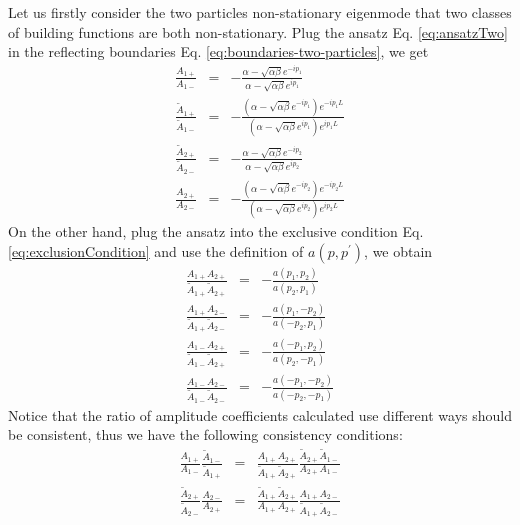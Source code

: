 \documentclass[aps,showpacs,twocolumn,floatfix,prx,superscriptaddress]{revtex4-1}
\begin{document}
Let us firstly consider the two particles non-stationary eigenmode that two classes of building functions are both non-stationary. Plug the ansatz Eq. \eqref{eq:ansatzTwo} in the reflecting boundaries Eq. \eqref{eq:boundaries-two-particles}, we get
\begin{subequations}
    \label{eq:scatterFactorBoundary2}
    \begin{eqnarray}
        \frac{A_{1+}}{A_{1-}} & = & -\frac{\alpha-\sqrt{\alpha\beta}
                e^{-ip_1}}{\alpha-\sqrt{\alpha\beta} e^{ip_1}}  \\
        \frac{\tilde{A}_{1+}}{\tilde{A}_{1-}} & = & 
        -\frac{\left(\alpha-\sqrt{\alpha\beta} e^{-ip_1}\right) e^{-ip_1L}}
        {\left(\alpha-\sqrt{\alpha\beta} e^{ip_1}\right) e^{ip_1L}}  \\
        \frac{\tilde{A}_{2+}}{\tilde{A}_{2-}} & = & -\frac{\alpha -
            \sqrt{\alpha\beta} e^{-ip_2}}{\alpha-\sqrt{\alpha\beta} e^{ip_2}}\\
        \frac{A_{2+}}{A_{2-}} & = & -\frac{\left(\alpha-\sqrt{\alpha\beta}
                e^{-ip_2}\right) e^{-ip_2L}}{\left(\alpha-\sqrt{\alpha\beta} 
                e^{ip_2}\right) e^{ip_2L}}
    \end{eqnarray}
\end{subequations}
On the other hand, plug the ansatz into the exclusive condition Eq. \eqref{eq:exclusionCondition} and use the definition of $a(p, p^\prime)$, we obtain
\begin{subequations}
    \label{eq:scatterFactorExclusive2}
    \begin{eqnarray}
        \frac{A_{1+}A_{2+}}{\tilde{A}_{1+}\tilde{A}_{2+}} & = & 
        -\frac{a(p_1, p_2)}{a(p_2, p_1)} \\
        \frac{A_{1+}A_{2-}}{\tilde{A}_{1+}\tilde{A}_{2-}} & = & 
        -\frac{a(p_1, -p_2)}{a(-p_2, p_1)} \\
        \frac{A_{1-}A_{2+}}{\tilde{A}_{1-}\tilde{A}_{2+}} & = & 
        -\frac{a(-p_1, p_2)}{a(p_2, -p_1)} \\
        \frac{A_{1-}A_{2-}}{\tilde{A}_{1-}\tilde{A}_{2-}} & = & 
        -\frac{a(-p_1, -p_2)}{a(-p_2, -p_1)}
    \end{eqnarray}
\end{subequations}
Notice that the ratio of amplitude coefficients calculated use different ways should be consistent, thus we have the following consistency conditions:
\begin{subequations}
    \label{eq:consistencyConditionTwo2}
    \begin{eqnarray}
        \frac{A_{1+}}{A_{1-}}\frac{\tilde{A}_{1-}}{\tilde{A}_{1+}} & = & 
        \frac{A_{1+}A_{2+}}{\tilde{A}_{1+}\tilde{A}_{2+}}
        \frac{\tilde{A}_{2+}\tilde{A}_{1-}}{A_{2+}A_{1-}} \\
        \frac{\tilde{A}_{2+}}{\tilde{A}_{2-}}\frac{A_{2-}}{A_{2+}} & = & 
        \frac{\tilde{A}_{1+}\tilde{A}_{2+}}{A_{1+}A_{2+}} 
        \frac{A_{1+}A_{2-}}{\tilde{A}_{1+}\tilde{A}_{2-}}
    \end{eqnarray}
\end{subequations}
\end{document}

